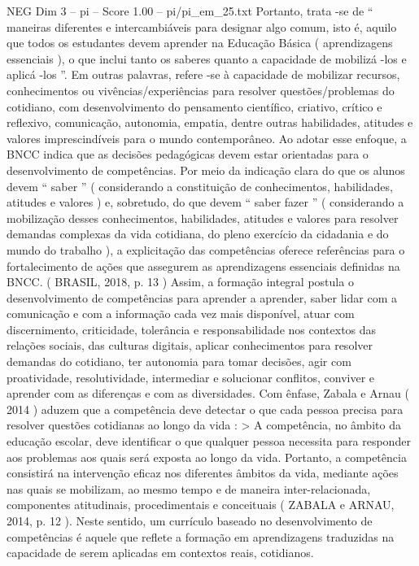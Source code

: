 \begin{textsample}{NEG Dim 3 – pi – Score 1.00 – pi/pi\_em\_25.txt}
Portanto, trata -se de “ maneiras diferentes e intercambiáveis para designar algo comum, isto é, aquilo que todos os estudantes devem aprender na Educação Básica ( aprendizagens essenciais ), o que inclui tanto os saberes quanto a capacidade de mobilizá -los e aplicá -los ”.
Em outras palavras, refere -se à capacidade de mobilizar recursos, conhecimentos ou vivências/experiências para resolver questões/problemas do cotidiano, com desenvolvimento do pensamento científico, criativo, crítico e reflexivo, comunicação, autonomia, empatia, dentre outras habilidades, atitudes e valores imprescindíveis para o mundo contemporâneo.
Ao adotar esse enfoque, a BNCC indica que as decisões pedagógicas devem estar orientadas para o desenvolvimento de competências.
Por meio da indicação clara do que os alunos devem “ saber ” ( considerando a constituição de conhecimentos, habilidades, atitudes e valores ) e, sobretudo, do que devem “ saber fazer ” ( considerando a mobilização desses conhecimentos, habilidades, atitudes e valores para resolver demandas complexas da vida cotidiana, do pleno exercício da cidadania e do mundo do trabalho ), a explicitação das competências oferece referências para o fortalecimento de ações que assegurem as aprendizagens essenciais definidas na BNCC. ( BRASIL, 2018, p. 13 ) Assim, a formação integral postula o desenvolvimento de competências para aprender a aprender, saber lidar com a comunicação e com a informação cada vez mais disponível, atuar com discernimento, criticidade, tolerância e responsabilidade nos contextos das relações sociais, das culturas digitais, aplicar conhecimentos para resolver demandas do cotidiano, ter autonomia para tomar decisões, agir com proatividade, resolutividade, intermediar e solucionar conflitos, conviver e aprender com as diferenças e com as diversidades.
Com ênfase, Zabala e Arnau ( 2014 ) aduzem que a competência deve detectar o que cada pessoa precisa para resolver questões cotidianas ao longo da vida : > A competência, no âmbito da educação escolar, deve identificar o que qualquer pessoa necessita para responder aos problemas aos quais será exposta ao longo da vida.
Portanto, a competência consistirá na intervenção eficaz nos diferentes âmbitos da vida, mediante ações nas quais se mobilizam, ao mesmo tempo e de maneira inter-relacionada, componentes atitudinais, procedimentais e conceituais ( ZABALA e ARNAU, 2014, p. 12 ).
Neste sentido, um currículo baseado no desenvolvimento de competências é aquele que reflete a formação em aprendizagens traduzidas na capacidade de serem aplicadas em contextos reais, cotidianos.

\end{textsample}
